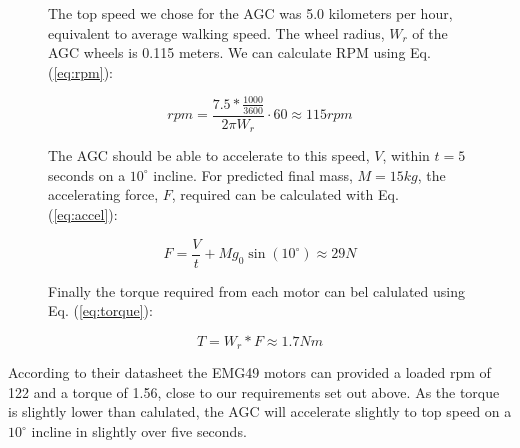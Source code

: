 \documentclass[11pt,landscape]{article}
\begin{document}
\begin{multicols}{3}
\begin{figure}[H]
    \begin{mdframed}
        The top speed we chose for the AGC was 5.0 kilometers per hour,
        equivalent to average walking speed. 
        The wheel radius, $W_r$ of the AGC wheels is 0.115 meters. We can
        calculate RPM using Eq. (\ref{eq:rpm}):
        \begin{center}
            \begin{equation}
                rpm = \frac{7.5 * \frac{1000}{3600}}{2\pi W_r} \cdot 60 \approx 115rpm
                \label{eq:rpm}
            \end{equation}
        \end{center}
        The AGC should be able
        to accelerate to this speed, $V$, within $t=5$ seconds on a $10^\circ$ incline.
        For predicted final mass, $M = 15kg$, 
        the accelerating force, $F$, required can be calculated with Eq. (\ref{eq:accel}):
        \begin{center}
            \begin{equation}
                F = \frac{V}{t} + M g_0 \sin(10^\circ)\approx 29 N
                \label{eq:accel}
            \end{equation}
        \end{center}
        Finally the torque required from each motor can bel calulated using Eq.
        (\ref{eq:torque}):
        \begin{center}
            \begin{equation}
                T = W_r * F \approx 1.7 Nm
                \label{eq:torque} 
            \end{equation}
        \end{center}
    \end{mdframed}
    \label{fig:motor_calcs}
\end{figure}

According to their datasheet the EMG49 motors can provided a loaded rpm of 122
and a torque of 1.56, close to our requirements set out above. As the torque is
slightly lower than calulated, the AGC will accelerate slightly to top speed on
a $10^\circ$ incline in slightly over five seconds.

\newpage
\nocite{*}


\end{multicols}
\end{document}
